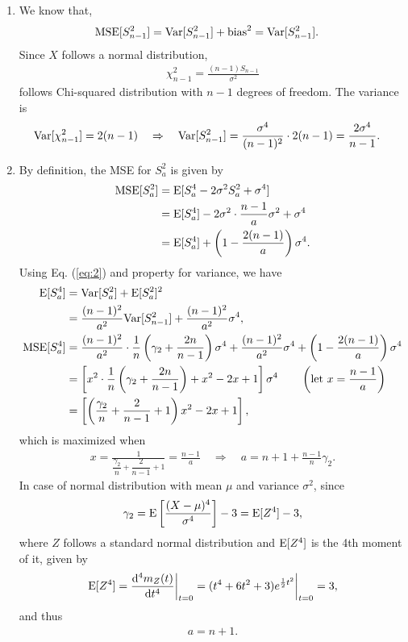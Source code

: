 \begin{enumerate}
	\item We know that,
	\begin{align*}
	\mathrm{MSE}[S_{n-1}^2] & = \mathrm{Var}[S_{n-1}^2] + \mathrm{bias}^2 = \mathrm{Var}[S_{n-1}^2].
	\end{align*}
	Since $X$ follows a normal distribution,
	\begin{align*}
	\chi_{n-1}^2 = \frac{(n-1)S_{n-1}}{\sigma^2}
	\end{align*}
	follows Chi-squared distribution with $n-1$ degrees of freedom. The variance is
	\begin{align*}
	\mathrm{Var}[\chi_{n-1}^2] = 2(n-1) \quad\Rightarrow\quad \mathrm{Var}[S_{n-1}^2] & = \frac{\sigma^4}{(n-1)^2}\cdot 2(n-1) = \frac{2\sigma^4}{n-1}.
	\end{align*}
	\item By definition, the MSE for $S_a^2$ is given by
	\begin{align*}
	\mathrm{MSE}[S_a^2] & = \mathrm{E}[S_a^4 - 2\sigma^2 S_a^2 + \sigma^4] \\
	& = \mathrm{E}[S_a^4] - 2\sigma^2 \cdot \frac{n-1}{a}\sigma^2 + \sigma^4 \\
	& = \mathrm{E}[S_a^4] + \left(1 - \frac{2(n-1)}{a} \right)\sigma^4.
	\end{align*}
	Using Eq. (\ref{eq:2}) and property for variance, we have
	\begin{align*}
	\mathrm{E}[S_a^4] & = \mathrm{Var}[S_a^2] + \mathrm{E}[S_a^2]^2 \\
	& = \frac{(n-1)^2}{a^2}\mathrm{Var}[S_{n-1}^2] + \frac{(n-1)^2}{a^2}\sigma^4, \\
	\mathrm{MSE}[S_a^4] & = \frac{(n-1)^2}{a^2}\cdot\frac{1}{n}\left(\gamma_2 + \frac{2n}{n-1} \right)\sigma^4 + \frac{(n-1)^2}{a^2}\sigma^4 + \left(1 - \frac{2(n-1)}{a} \right)\sigma^4 \\
	& = \left[x^2\cdot\frac{1}{n}\left(\gamma_2+\frac{2n}{n-1} \right) + x^2 - 2x + 1 \right]\sigma^4 \qquad \left(\mathrm{let\ } x = \frac{n-1}{a}\right) \\
	& = \left[\left(\frac{\gamma_2}{n} + \frac{2}{n-1} + 1\right)x^2 - 2x + 1 \right],
	\end{align*}
	which is maximized when
	\begin{align*}
	x = \frac{1}{\dfrac{\gamma_2}{n} + \dfrac{2}{n-1} + 1} = \frac{n-1}{a}\quad \Rightarrow\quad a = n + 1 + \frac{n-1}{n}\gamma_2.
	\end{align*}
	In case of normal distribution with mean $\mu$ and variance $\sigma^2$, since
	\begin{align*}
	\gamma_2 = \mathrm{E}\left[\frac{(X-\mu)^4}{\sigma^4} \right] - 3 = \mathrm{E}[Z^4] - 3,
	\end{align*}
	where $Z$ follows a standard normal distribution and $\mathrm{E}[Z^4]$ is the 4th moment of it, given by
	\begin{align*}
	\mathrm{E}[Z^4] = \frac{\mathrm{d}^4m_Z(t)}{\mathrm{d}t^4}\bigg|_{t=0} = (t^4 + 6t^2 + 3) e^{\frac{1}{2}t^2}\bigg|_{t=0} = 3,
	\end{align*}
	and thus
	\begin{align*}
	a = n + 1.
	\end{align*}
\end{enumerate}
